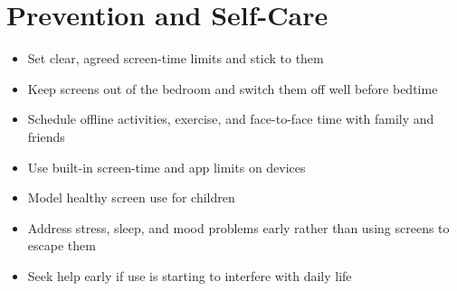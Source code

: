 \section*{Prevention and Self-Care}
\begin{itemize}
    \item Set clear, agreed screen-time limits and stick to them
    \item Keep screens out of the bedroom and switch them off well before bedtime
    \item Schedule offline activities, exercise, and face-to-face time with family and friends
    \item Use built-in screen-time and app limits on devices
    \item Model healthy screen use for children
    \item Address stress, sleep, and mood problems early rather than using screens to escape them
    \item Seek help early if use is starting to interfere with daily life
\end{itemize}
